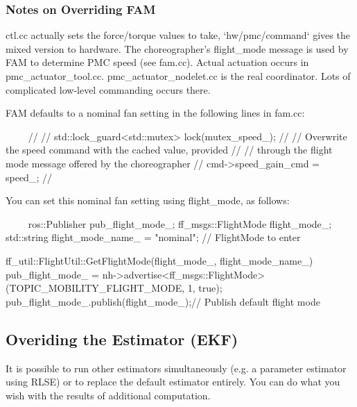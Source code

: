 \documentclass{article}
\begin{document}
\subsubsection{Notes on Overriding FAM}
\begin{markdown}
ctl.cc actually sets the force/torque values to take, `hw/pmc/command` gives the mixed version to hardware. The choreographer's flight\_mode message is used by FAM to determine PMC speed (see fam.cc). Actual actuation occurs in pmc\_actuator\_tool.cc. pmc\_actuator\_nodelet.cc is the real coordinator. Lots of complicated low-level commanding occurs there.

FAM defaults to a nominal fan setting in the following lines in fam.cc:

~~~~
// {
//   std::lock_guard<std::mutex> lock(mutex_speed_);
//   // Overwrite the speed command with the cached value, provided
//   // through the flight mode message offered by the choreographer
//   cmd->speed_gain_cmd = speed_;
// }
 ~~~~
 
You can set this nominal fan setting using flight\_mode, as follows:

~~~~
ros::Publisher pub_flight_mode_;
ff_msgs::FlightMode flight_mode_;
std::string flight_mode_name_ = "nominal";  // FlightMode to enter

ff_util::FlightUtil::GetFlightMode(flight_mode_, flight_mode_name_)
pub_flight_mode_ = nh->advertise<ff_msgs::FlightMode>(TOPIC_MOBILITY_FLIGHT_MODE, 1, true);
pub_flight_mode_.publish(flight_mode_);// Publish default flight mode
~~~~
\end{markdown}

\subsection{Overiding the Estimator (EKF)}

It is possible to run other estimators simultaneously (e.g. a parameter estimator using RLSE) or to replace the default estimator entirely. You can do what you wish with the results of additional computation.
\end{document}
